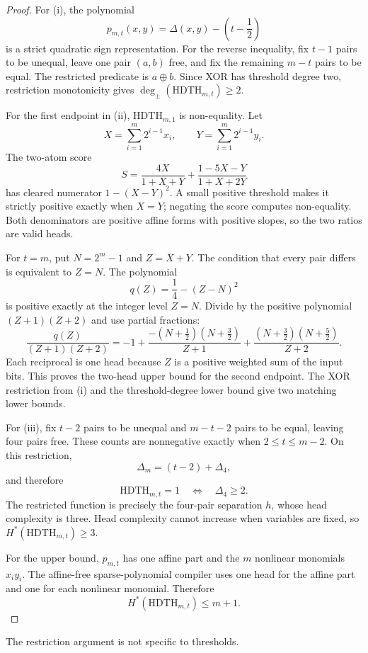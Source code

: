 \documentclass[10pt]{article}
\theoremstyle{definition}
\theoremstyle{remark}
\newcommand{\Hstar}{H^{\ast}}
\newcommand{\tdeg}{\deg_{\pm}}
\newcommand{\HDTH}{\mathrm{HDTH}}
\begin{document}
\begin{proof}
For (i), the polynomial
\[
p_{m,t}(x,y)=\Delta(x,y)-\left(t-\frac12\right)
\]
is a strict quadratic sign representation. For the reverse inequality, fix $t-1$ pairs
to be unequal, leave one pair $(a,b)$ free, and fix the remaining $m-t$ pairs to be
equal. The restricted predicate is $a\oplus b$. Since XOR has threshold degree two,
restriction monotonicity gives $\tdeg(\HDTH_{m,t})\geq2$.

For the first endpoint in (ii), $\HDTH_{m,1}$ is non-equality. Let
\[
X=\sum_{i=1}^{m}2^{i-1}x_i,\qquad
Y=\sum_{i=1}^{m}2^{i-1}y_i.
\]
The two-atom score
\[
S=\frac{4X}{1+X+Y}+\frac{1-5X-Y}{1+X+2Y}
\]
has cleared numerator $1-(X-Y)^2$. A small positive threshold makes it strictly
positive exactly when $X=Y$; negating the score computes non-equality. Both denominators
are positive affine forms with positive slopes, so the two ratios are valid heads.

For $t=m$, put $N=2^m-1$ and $Z=X+Y$. The condition that every pair differs is
equivalent to $Z=N$. The polynomial
\[
q(Z)=\frac14-(Z-N)^2
\]
is positive exactly at the integer level $Z=N$. Divide by the positive polynomial
$(Z+1)(Z+2)$ and use partial fractions:
\[
\frac{q(Z)}{(Z+1)(Z+2)}
=-1+\frac{-(N+\tfrac12)(N+\tfrac32)}{Z+1}
+\frac{(N+\tfrac32)(N+\tfrac52)}{Z+2}.
\]
Each reciprocal is one head because $Z$ is a positive weighted sum of the input bits.
This proves the two-head upper bound for the second endpoint. The XOR restriction from
(i) and the threshold-degree lower bound give two matching lower bounds.

For (iii), fix $t-2$ pairs to be unequal and $m-t-2$ pairs to be equal, leaving four
pairs free. These counts are nonnegative exactly when $2\leq t\leq m-2$. On this
restriction,
\[
\Delta_m=(t-2)+\Delta_4,
\]
and therefore
\[
\HDTH_{m,t}=1\quad\Longleftrightarrow\quad \Delta_4\geq2.
\]
The restricted function is precisely the four-pair separation $h$, whose head complexity
is three. Head complexity cannot increase when variables are fixed, so
$\Hstar(\HDTH_{m,t})\geq3$.

For the upper bound, $p_{m,t}$ has one affine part and the $m$ nonlinear monomials
$x_i y_i$. The affine-free sparse-polynomial compiler uses one head for the affine part
and one for each nonlinear monomial. Therefore
\[
\Hstar(\HDTH_{m,t})\leq m+1.
\]
\end{proof}

The restriction argument is not specific to thresholds.
\end{document}
